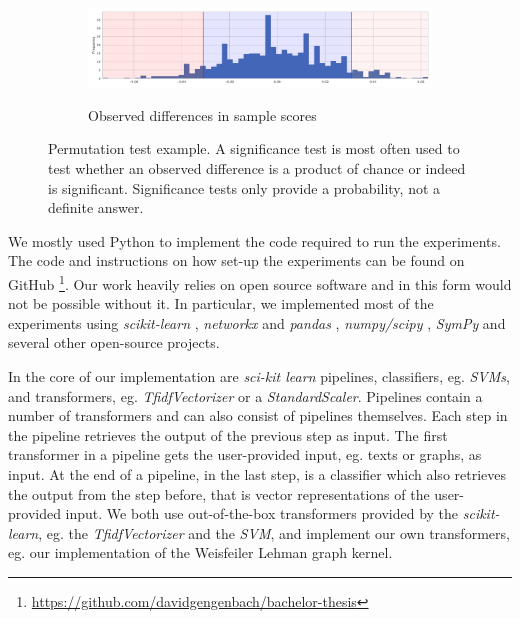 \begin{figure}[htb!]
  \begin{subfigure}[t]{\linewidth}
  {\includegraphics[width=1\textwidth]{assets/figures/permutation_test/distribution.pdf}\label{fig:permutation_test_distribution}}
  \caption{Observed differences in sample scores}
  \end{subfigure}
  \caption[Example: Permutation Test]{Permutation test example. A significance test is most often used to test whether an observed difference is a product of chance or indeed is significant. Significance tests only provide a probability, not a definite answer.}
  \label{fig:example_permutation_test}
\end{figure}


We mostly used Python to implement the code required to run the experiments.
The code and instructions on how set-up the experiments can be found on GitHub \footnote{\url{https://github.com/davidgengenbach/bachelor-thesis}}.
Our work heavily relies on open source software and in this form would not be possible without it.
In particular, we implemented most of the experiments using \textit{scikit-learn} \cite{Pedregosa2012}, \textit{networkx} \cite{Hagberg2008} and \textit{pandas} \cite{McKinney2010}, \textit{numpy/scipy} \cite{VanderWalt2011}, \textit{SymPy} \cite{Meurer2017} and several other open-source projects.

In the core of our implementation are \textit{sci-kit learn} pipelines, classifiers, eg. \textit{SVMs}, and transformers, eg. \textit{TfidfVectorizer} or a \textit{StandardScaler}.
Pipelines contain a number of transformers and can also consist of pipelines themselves.
Each step in the pipeline retrieves the output of the previous step as input.
The first transformer in a pipeline gets the user-provided input, eg. texts or graphs, as input.
At the end of a pipeline, in the last step, is a classifier which also retrieves the output from the step before, that is vector representations of the user-provided input.
We both use out-of-the-box transformers provided by the \textit{scikit-learn}, eg. the \textit{TfidfVectorizer} and the \textit{SVM}, and implement our own transformers, eg. our implementation of the Weisfeiler Lehman graph kernel.

